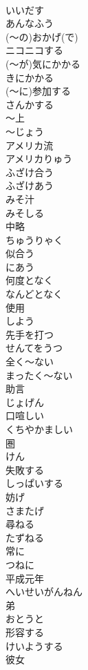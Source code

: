 \documentclass[8pt]{extreport}
\begin{document}
\begin{CJK}{UTF8}{min}
\\	いいだす
\\	あんなふう	
\\	(～の)おかげ(で)	
\\	ニコニコする	
\\	(～が)気にかかる	
\\	きにかかる
\\	(～に)参加する	
\\	さんかする
\\	～上	
\\	～じょう
\\	アメリカ流	
\\	アメリカりゅう
\\	ふざけ合う	
\\	ふざけあう
\\	みそ汁	
\\	みそしる
\\	中略	
\\	ちゅうりゃく
\\	似合う	
\\	にあう
\\	何度となく	
\\	なんどとなく
\\	使用	
\\	しよう
\\	先手を打つ	
\\	せんてをうつ
\\	全く～ない	
\\	まったく～ない
\\	助言	
\\	じょげん
\\	口喧しい	
\\	くちやかましい
\\	圏	
\\	けん
\\	失敗する	
\\	しっぱいする
\\	妨げ	
\\	さまたげ
\\	尋ねる	
\\	たずねる
\\	常に	
\\	つねに
\\	平成元年	
\\	へいせいがんねん
\\	弟	
\\	おとうと
\\	形容する	
\\	けいようする
\\	彼女	

\end{CJK}
\end{document}

